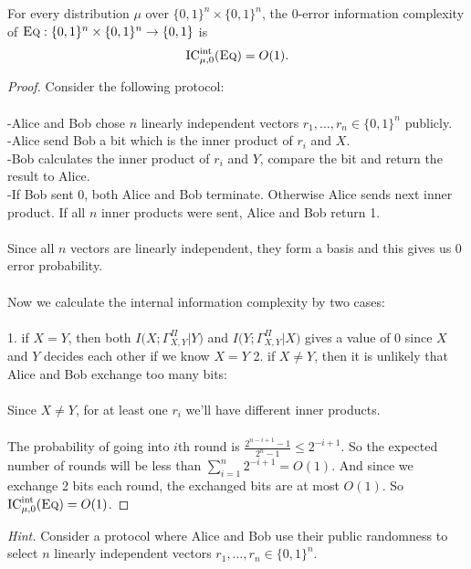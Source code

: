 \begin{theorem}
	For every distribution $\mu$ over $\{0,1\}^n \times \{0,1\}^n$, the $0$-error information complexity of $\textsc{Eq} : \{0,1\}^n \times \{0,1\}^n \to \{0,1\}$ is 
	\[
	\mathrm{IC}^{\mathrm{int}}_{\mu,0}(\textsc{Eq}) = O(1).
	\]
\end{theorem}

\begin{proof}
	Consider the following protocol:\\
	\\
	-Alice and Bob chose $n$ linearly independent vectors $r_1,\ldots,r_n \in \{0,1\}^n$ publicly.\\
	-Alice send Bob a bit which is the inner product of $r_i$ and $X$.\\
	-Bob calculates the inner product of $r_i$ and $Y$, compare the bit and return the result to Alice.\\
	-If Bob sent 0, both Alice and Bob terminate. Otherwise Alice sends next inner product. If all $n$ inner products were sent, Alice and Bob return 1.\\
	\\
	Since all $n$ vectors are linearly independent, they form a basis and this gives us $0$ error probability.\\
	\\
	Now we calculate the internal information complexity by two cases:\\
	\\
	1. if $X=Y$, then both $I\big( X ; \Gamma_{X,Y}^\Pi|Y\big)$ and $I\big( Y ; \Gamma_{X,Y}^\Pi|X\big)$ gives a value of 0 since $X$ and $Y$ decides each other if we know $X=Y$
	2. if $X \neq Y$, then it is unlikely that Alice and Bob exchange too many bits: \\
	\\
	Since $X \neq Y$, for at least one $r_i$ we'll have different inner products. \\
	\\
	The probability of going into $i$th round is $\frac{2^{n-i+1}-1}{2^n-1}\leq2^{-i+1}$. So the expected number of rounds will be  less than $\sum_{i=1}^{n}2^{-i+1}=O(1)$. And since we exchange 2 bits each round, the exchanged bits are at most $O(1)$. So $\mathrm{IC}^{\mathrm{int}}_{\mu,0}(\textsc{Eq}) = O(1)$.
\end{proof}

\bigskip
\noindent \emph{Hint.} Consider a protocol where Alice and Bob use their public randomness to select $n$ linearly independent vectors $r_1,\ldots,r_n \in \{0,1\}^n$.



